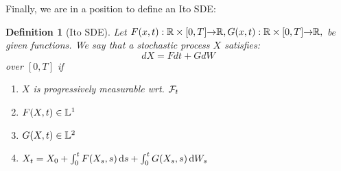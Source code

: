 \documentclass{article}
\newtheorem{ex}{Example}[thm]
\newtheorem{defn}{Definition}[thm]
\begin{document}
Finally, we are in a position to define an Ito SDE:

\begin{defn}[Ito SDE] Let
$F(x,t):{ \mathbb{R} }\times [0,T]{\rightarrow} { \mathbb{R} },  G(x,t):{ \mathbb{R} }\times [0,T]{\rightarrow} { \mathbb{R} },$ be given functions.
We say that a stochastic process $X$ satisfies:
\begin{equation}
dX =F dt + G dW
\end{equation} 
over $[0,T]$ if
\begin{enumerate}
  \item $X$ is progressively measurable wrt. ${\mathcal{F}}_t$
  \item $F(X,t) \in {\mathbb{L}^1}$
  \item $G(X,t) \in {\mathbb{L}^2}$ 
  \item $X_t = X_0 + \int_0^t F(X_s, s) \, \mathrm{d} s + \int_0^t G(X_s, s) \, \mathrm{d} W_s$
\end{enumerate}
\end{defn}

\end{document}
